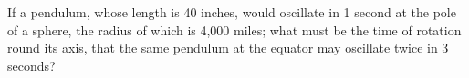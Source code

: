If a pendulum, whose length is 40 inches, would oscillate 
in 1 second at the pole of a sphere, the radius of which
is 4,000 miles; what must be the time of rotation round 
its axis, that the same pendulum at the equator may
oscillate twice in 3 seconds?
